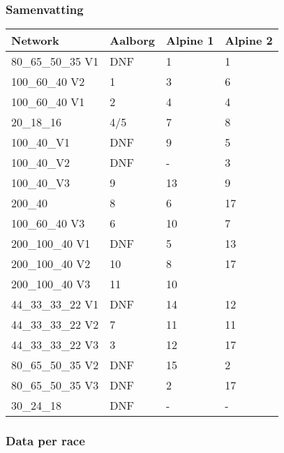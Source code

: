 \subsubsection*{Samenvatting}
\begin{table}[H]
\begin{tabular}{llll}
 \textbf{Network} & \textbf{Aalborg} & \textbf{Alpine 1} & \textbf{Alpine 2}\\ \hline
 80\_65\_50\_35 V1 & DNF & 1 & 1 \\
 100\_60\_40 V2 & 1 & 3 & 6\\
 100\_60\_40 V1 & 2 & 4 & 4 \\ \hline
 20\_18\_16 & 4/5 & 7 & 8 \\
 100\_40\_V1 & DNF & 9 & 5 \\
 100\_40\_V2 & DNF & - & 3\\
 100\_40\_V3 & 9 & 13 & 9 \\
 200\_40 & 8 & 6 & 17 \\
 100\_60\_40 V3 & 6 & 10 & 7 \\
 200\_100\_40 V1 & DNF & 5 & 13 \\
 200\_100\_40 V2 & 10 & 8 & 17\\
 200\_100\_40 V3 & 11 & 10 \\
 44\_33\_33\_22 V1 & DNF & 14 & 12\\
 44\_33\_33\_22 V2 & 7 & 11& 11\\
 44\_33\_33\_22 V3 & 3 & 12 & 17\\
 80\_65\_50\_35 V2 & DNF & 15 & 2\\
 80\_65\_50\_35 V3 & DNF & 2 & 17\\
 30\_24\_18 & DNF & - & - \\
\end{tabular}
\end{table}

\pagebreak
\subsubsection*{Data per race}

